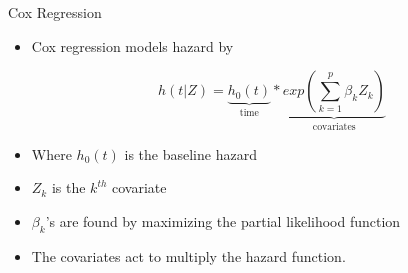\begin{frame}{Cox Regression}
\begin{itemize}
   \item Cox regression models hazard by 
   
   $$h(t|Z)=\underbrace{h_{0}(t)}_{\textrm{time}}*\underbrace{exp(\sum_{k=1}^{p}\beta_{k}Z_{k})}_{\textrm{covariates}}$$

   \item Where $h_{0}(t)$ is the baseline hazard
   \item $Z_k$ is the $k^{th}$ covariate
   \item $\beta_k$'s are found by maximizing the partial likelihood function
\item The covariates act to multiply the hazard function.
\end{itemize}

\end{frame}
